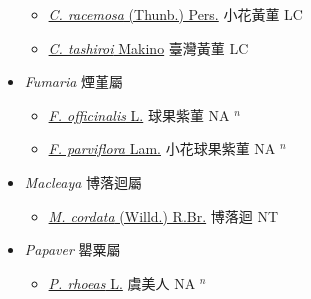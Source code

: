 \begin{itemize}
\begin{itemize}
        \item[] \href{http://www.theplantlist.org/tpl1.1/search?q=Corydalis+racemosa}{\textit{C. racemosa} (Thunb.) Pers.}   小花黃菫 LC
        \item[] \href{http://www.theplantlist.org/tpl1.1/search?q=Corydalis+tashiroi}{\textit{C. tashiroi} Makino}   臺灣黃菫 LC
  \end{itemize}
 \item[] \textit{Fumaria} 煙堇屬
                    
  \begin{itemize}
        \item[] \href{http://www.theplantlist.org/tpl1.1/search?q=Fumaria+officinalis}{\textit{F. officinalis} L.}   球果紫菫 NA $^n$
        \item[] \href{http://www.theplantlist.org/tpl1.1/search?q=Fumaria+parviflora}{\textit{F. parviflora} Lam.}   小花球果紫菫 NA $^n$
  \end{itemize}
 \item[] \textit{Macleaya} 博落迴屬
                    
  \begin{itemize}
        \item[] \href{http://www.theplantlist.org/tpl1.1/search?q=Macleaya+cordata}{\textit{M. cordata} (Willd.) R.Br.}   博落迴 NT
  \end{itemize}
 \item[] \textit{Papaver} 罌粟屬
                    
  \begin{itemize}
        \item[] \href{http://www.theplantlist.org/tpl1.1/search?q=Papaver+rhoeas}{\textit{P. rhoeas} L.}   虞美人 NA $^n$
  \end{itemize}
  \end{itemize}
